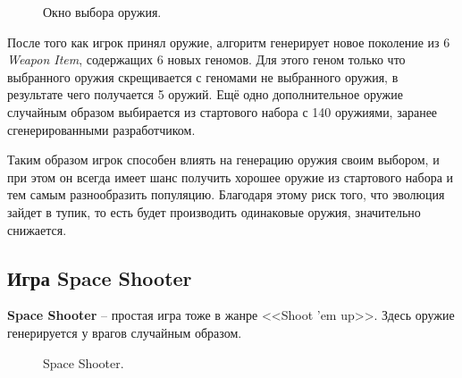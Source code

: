 \begin{figure}[ht]
    \begin{center}

        \caption{
            \label{SSCanvas}
            Окно выбора оружия.
        }
    \end {center}
\end {figure}

После того как игрок принял оружие, алгоритм генерирует новое поколение из 6 \textit{Weapon Item}, содержащих 6 новых геномов. Для этого геном только что выбранного оружия скрещивается с геномами не выбранного оружия, в результате чего получается 5 оружий. Ещё одно дополнительное оружие случайным образом выбирается из стартового набора с 140 оружиями, заранее сгенерированными разработчиком.

Таким образом игрок способен влиять на генерацию оружия своим выбором, и при этом он всегда имеет шанс получить хорошее оружие из стартового набора и тем самым разнообразить популяцию. Благодаря этому риск того, что эволюция зайдет в тупик, то есть будет производить одинаковые оружия, значительно снижается.

\subsection{Игра Space Shooter}

\textbf{Space Shooter} -- простая игра тоже в жанре <<Shoot ’em up>>. Здесь оружие генерируется у врагов случайным образом.

\begin{figure}[ht]
    \begin{center}

        \caption{
            \label{SpaceShooter}
            Space Shooter.
        }
    \end {center}
\end {figure}

\pagebreak
